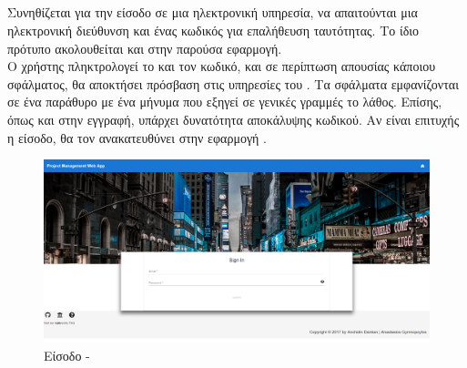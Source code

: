 \subsection*{}
\pSpace Συνηθίζεται για την είσοδο σε μια ηλεκτρονική υπηρεσία, να απαιτούνται μια ηλεκτρονική διεύθυνση και ένας κωδικός για επαλήθευση ταυτότητας. Το ίδιο πρότυπο ακολουθείται και στην παρούσα εφαρμογή.\\
\pSpace Ο χρήστης πληκτρολογεί το  και τον κωδικό, και σε περίπτωση απουσίας κάποιου σφάλματος, θα αποκτήσει πρόσβαση στις υπηρεσίες του . Τα σφάλματα εμφανίζονται σε ένα  παράθυρο με ένα μήνυμα που εξηγεί σε γενικές γραμμές το λάθος. Επίσης, όπως και στην εγγραφή, υπάρχει δυνατότητα αποκάλυψης κωδικού. Αν είναι επιτυχής η είσοδο, θα τον ανακατευθύνει στην εφαρμογή .

\begin{figure}[!htb]
\centering
\includegraphics[scale=0.2]{images/login.png}
\caption{Είσοδο - }
\label{fig:login}
\end{figure}

